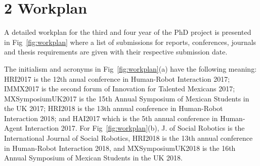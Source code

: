 \documentclass{sigchi}
\begin{document}
\section{2 Workplan}
A detailed workplan for the third and four year of the PhD project is presented
in Fig~\ref{fig:workplan} where a list of submissions for reports, conferences,
journals and thesis requirements are given with their respective submission date.

The initialism and acronyms in Fig~\ref{fig:workplan}(a) have the following meaning:
HRI2017 is the 12th anual conference in Human-Robot Interaction 2017;
IMMX2017 is the second forum of Innovation for Talented Mexicans 2017;
MXSymposiumUK2017 is the 15th Annual Symposium of Mexican Students in the UK 2017;
HRI2018 is the 13th annual conference in Human-Robot Interaction 2018;
and HAI2017 which is the 5th annual conference in Human-Agent Interaction 2017.
For Fig~\ref{fig:workplan}(b),
J. of Social Robotics is the International Journal of Social Robotics,
HRI2018 is the 13th annual conference in Human-Robot Interaction 2018,
and
MXSymposiumUK2018 is the 16th Annual Symposium of Mexican Students in the UK 2018.
\end{document}
